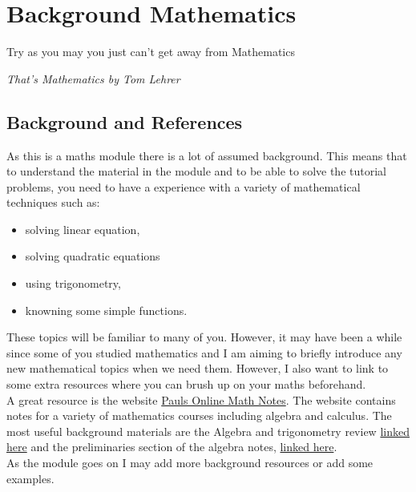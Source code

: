 
\chapter{Background Mathematics}
\label{sec:background}

\epigraph{Try as you may you just can't get away from Mathematics }{\textit{That's Mathematics by Tom Lehrer}}

\section{Background and References}
As this is a maths module there is a lot of assumed background.  This means that to understand the material in the module and to be able to solve the tutorial problems, you need to have a experience with a variety of mathematical techniques such as:
\begin{itemize}
    \item solving linear equation,
    \item solving quadratic equations
    \item using trigonometry,
    \item knowning some simple functions.
\end{itemize}

These topics will be familiar to many of you. However, it may have been a while since some of you studied mathematics and I am aiming to briefly introduce any new mathematical topics when we need them. However, I also want to link to some extra resources where you can brush up on your maths beforehand.\\


A great resource is the website \href{https://tutorial.math.lamar.edu/}{Pauls Online Math Notes}. The website contains notes for a variety of mathematics courses including algebra and calculus. The most useful background materials are the Algebra and trigonometry review \href{https://tutorial.math.lamar.edu/Extras/AlgebraTrigReview/AlgebraTrigIntro.aspx}{linked here} and the preliminaries section of the algebra notes, \href{https://tutorial.math.lamar.edu/Classes/Alg/Preliminaries.aspx}{linked here}.\\

As the module goes on I may add more background resources or add some examples.\\


